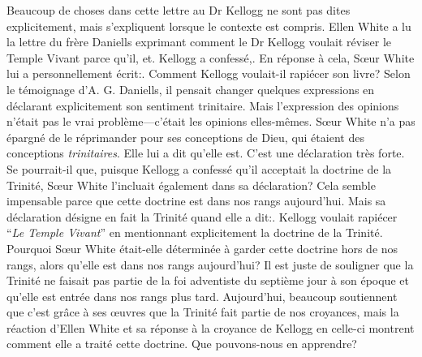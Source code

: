 Beaucoup de choses dans cette lettre au Dr Kellogg ne sont pas dites explicitement, mais s'expliquent lorsque le contexte est compris. Ellen White a lu la lettre du frère Daniells exprimant comment le Dr Kellogg voulait réviser le Temple Vivant parce qu'il, et. Kellogg a confessé,. En réponse à cela, Sœur White lui a personnellement écrit:. Comment Kellogg voulait-il rapiécer son livre? Selon le témoignage d'A. G. Daniells, il pensait changer quelques expressions en déclarant explicitement son sentiment trinitaire. Mais l'expression des opinions n'était pas le vrai problème—c'était les opinions elles-mêmes. Sœur White n'a pas épargné de le réprimander pour ses conceptions de Dieu, qui étaient des conceptions \textit{trinitaires}. Elle lui a dit qu'elle est. C'est une déclaration très forte. Se pourrait-il que, puisque Kellogg a confessé qu'il acceptait la doctrine de la Trinité, Sœur White l'incluait également dans sa déclaration? Cela semble impensable parce que cette doctrine est dans nos rangs aujourd'hui. Mais sa déclaration désigne en fait la Trinité quand elle a dit:. Kellogg voulait rapiécer “\textit{Le Temple Vivant}” en mentionnant explicitement la doctrine de la Trinité. Pourquoi Sœur White était-elle déterminée à garder cette doctrine hors de nos rangs, alors qu'elle est dans nos rangs aujourd'hui? Il est juste de souligner que la Trinité ne faisait pas partie de la foi adventiste du septième jour à son époque et qu'elle est entrée dans nos rangs plus tard. Aujourd'hui, beaucoup soutiennent que c'est grâce à ses œuvres que la Trinité fait partie de nos croyances, mais la réaction d'Ellen White et sa réponse à la croyance de Kellogg en celle-ci montrent comment elle a traité cette doctrine. Que pouvons-nous en apprendre?


